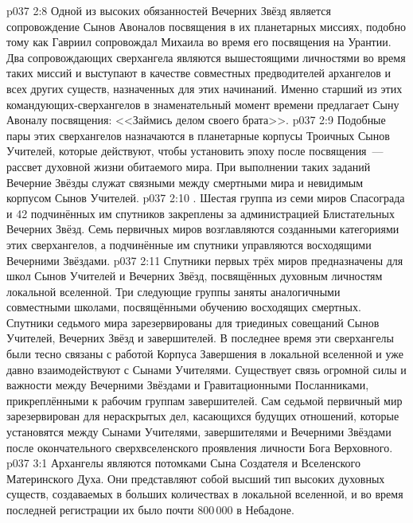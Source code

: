 \vs p037 2:8 Одной из высоких обязанностей Вечерних Звёзд является сопровождение Сынов Авоналов посвящения в их планетарных миссиях, подобно тому как Гавриил сопровождал Михаила во время его посвящения на Урантии. Два сопровождающих сверхангела являются вышестоящими личностями во время таких миссий и выступают в качестве совместных предводителей архангелов и всех других существ, назначенных для этих начинаний. Именно старший из этих командующих\hyp{}сверхангелов в знаменательный момент времени предлагает Сыну Авоналу посвящения: <<Займись делом своего брата>>.
\vs p037 2:9 Подобные пары этих сверхангелов назначаются в планетарные корпусы Троичных Сынов Учителей, которые действуют, чтобы установить эпоху после посвящения~--- рассвет духовной жизни обитаемого мира. При выполнении таких заданий Вечерние Звёзды служат связными между смертными мира и невидимым корпусом Сынов Учителей.
\vs p037 2:10 \pc {}. Шестая группа из семи миров Спасограда и 42 подчинённых им спутников закреплены за администрацией Блистательных Вечерних Звёзд. Семь первичных миров возглавляются созданными категориями этих сверхангелов, а подчинённые им спутники управляются восходящими Вечерними Звёздами.
\vs p037 2:11 Спутники первых трёх миров предназначены для школ Сынов Учителей и Вечерних Звёзд, посвящённых духовным личностям локальной вселенной. Три следующие группы заняты аналогичными совместными школами, посвящёнными обучению восходящих смертных. Спутники седьмого мира зарезервированы для триединых совещаний Сынов Учителей, Вечерних Звёзд и завершителей. В последнее время эти сверхангелы были тесно связаны с работой Корпуса Завершения в локальной вселенной и уже давно взаимодействуют с Сынами Учителями. Существует связь огромной силы и важности между Вечерними Звёздами и Гравитационными Посланниками, прикреплёнными к рабочим группам завершителей. Сам седьмой первичный мир зарезервирован для нераскрытых дел, касающихся будущих отношений, которые установятся между Сынами Учителями, завершителями и Вечерними Звёздами после окончательного сверхвселенского проявления личности Бога Верховного.
\vs p037 3:1 Архангелы являются потомками Сына Создателя и Вселенского  Материнского Духа. Они представляют собой высший тип высоких духовных существ, создаваемых в больших количествах в локальной вселенной, и во время последней регистрации их было почти 800\,000 в Небадоне.
